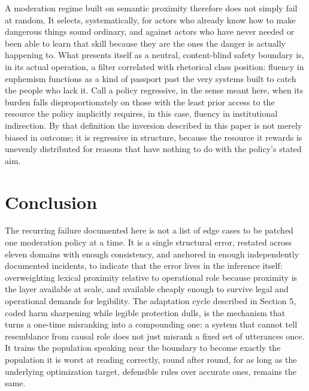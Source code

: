 \documentclass[11pt]{article}
\begin{document}
A moderation regime built on semantic proximity therefore does not simply fail at random. It selects, systematically, for actors who already know how to make dangerous things sound ordinary, and against actors who have never needed or been able to learn that skill because they are the ones the danger is actually happening to. What presents itself as a neutral, content-blind safety boundary is, in its actual operation, a filter correlated with rhetorical class position: fluency in euphemism functions as a kind of passport past the very systems built to catch the people who lack it. Call a policy regressive, in the sense meant here, when its burden falls disproportionately on those with the least prior access to the resource the policy implicitly requires, in this case, fluency in institutional indirection. By that definition the inversion described in this paper is not merely biased in outcome; it is regressive in structure, because the resource it rewards is unevenly distributed for reasons that have nothing to do with the policy's stated aim.

\section{Conclusion}

The recurring failure documented here is not a list of edge cases to be patched one moderation policy at a time. It is a single structural error, restated across eleven domains with enough consistency, and anchored in enough independently documented incidents, to indicate that the error lives in the inference itself: overweighting lexical proximity relative to operational role because proximity is the layer available at scale, and available cheaply enough to survive legal and operational demands for legibility. The adaptation cycle described in Section 5, coded harm sharpening while legible protection dulls, is the mechanism that turns a one-time misranking into a compounding one: a system that cannot tell resemblance from causal role does not just misrank a fixed set of utterances once. It trains the population speaking near the boundary to become exactly the population it is worst at reading correctly, round after round, for as long as the underlying optimization target, defensible rules over accurate ones, remains the same.
\end{document}
